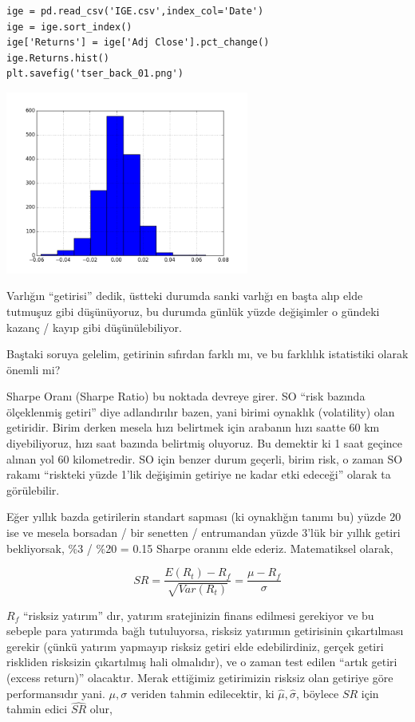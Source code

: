 \documentclass[12pt,fleqn]{article}\usepackage{../../common}
\begin{document}
\begin{verbatim}
ige = pd.read_csv('IGE.csv',index_col='Date')
ige = ige.sort_index()
ige['Returns'] = ige['Adj Close'].pct_change()
ige.Returns.hist()
plt.savefig('tser_back_01.png')
\end{verbatim}

\includegraphics[height=6cm]{tser_back_01.png}

Varlığın ``getirisi'' dedik, üstteki durumda sanki varlığı en başta alıp
elde tutmuşuz gibi düşünüyoruz, bu durumda günlük yüzde değişimler o gündeki
kazanç / kayıp gibi düşünülebiliyor. 

Baştaki soruya gelelim, getirinin sıfırdan farklı mı, ve bu farklılık
istatistiki olarak önemli mi?

Sharpe Oranı (Sharpe Ratio) bu noktada devreye girer. SO ``risk bazında
ölçeklenmiş getiri'' diye adlandırılır bazen, yani birimi oynaklık (volatility)
olan getiridir. Birim derken mesela hızı belirtmek için arabanın hızı saatte 60
km diyebiliyoruz, hızı saat bazında belirtmiş oluyoruz. Bu demektir ki 1 saat
geçince alınan yol 60 kilometredir. SO için benzer durum geçerli, birim risk, o
zaman SO rakamı ``riskteki yüzde 1'lik değişimin getiriye ne kadar etki
edeceği'' olarak ta görülebilir.

Eğer yıllık bazda getirilerin standart sapması (ki oynaklığın tanımı bu) yüzde
20 ise ve mesela borsadan / bir senetten / entrumandan yüzde 3'lük bir yıllık
getiri bekliyorsak, \%3 / \%20 = 0.15 Sharpe oranını elde ederiz. Matematiksel
olarak,

$$ SR = \frac{E(R_t) - R_f}{\sqrt{Var(R_t)}} = \frac{\mu - R_f}{\sigma} $$

$R_f$ ``risksiz yatırım'' dır, yatırım sratejinizin finans edilmesi
gerekiyor ve bu sebeple para yatırımda bağlı tutuluyorsa, risksiz yatırımın
getirisinin çıkartılması gerekir (çünkü yatırım yapmayıp risksiz getiri
elde edebilirdiniz, gerçek getiri riskliden risksizin çıkartılmış hali
olmalıdır), ve o zaman test edilen ``artık getiri (excess return)''
olacaktır. Merak ettiğimiz getirimizin risksiz olan getiriye göre
performansıdır yani. $\mu,\sigma$ veriden tahmin edilecektir, ki
$\hat{\mu},\hat{\sigma}$, böylece $SR$ için tahmin edici $\hat{SR}$ olur,
\end{document}
